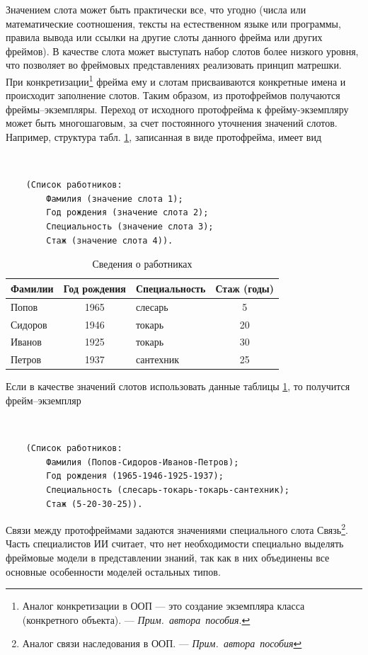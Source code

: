 \documentclass[12pt, openany, twoside]{book} %
\def\AR{{\em Прим.~автора~пособия}}
\begin{document}
Значением слота может быть практически все, что угодно (числа или математические соотношения, тексты на естественном языке или программы, правила вывода или ссылки на другие слоты данного фрейма или других фреймов). В качестве слота может выступать набор слотов более низкого уровня, что позволяет во фреймовых представлениях реализовать принцип матрешки. При конкретизации\footnote{Аналог конкретизации в ООП --- это создание экземпляра класса (конкретного объекта). --- \AR.} фрейма ему и слотам присваиваются конкретные имена и происходит заполнение слотов. Таким образом, из протофреймов получаются фреймы--экземпляры. Переход от исходного протофрейма к фрейму-эк\-зем\-пля\-ру может быть многошаговым, за счет постоянного
уточнения значений слотов. Например, структура табл. \ref{tab:frame}, записанная в виде протофрейма, имеет вид
{\tt
\begin{verbatim}
    (Список работников:
        Фамилия (значение слота 1);
        Год рождения (значение слота 2);
        Специальность (значение слота 3);
        Стаж (значение слота 4)).
\end{verbatim}}

\begin{table}[h]
\begin{center}
\begin{tabular}{|lclc|}
 \hline
 Фамилии & Год рождения  &  Специальность &  Стаж (годы)
 \\\hline\hline
 Попов &  1965 &   слесарь & 5
   \\\hline
   Сидоров & 1946  &  токарь & 20
    \\\hline
    Иванов & 1925  &  токарь & 30
    \\\hline
    Петров & 1937  &  сантехник &  25
    \\\hline
\end{tabular}
\end{center}
\caption{Сведения о работниках} \label{tab:frame}
\end{table}

Если в качестве значений слотов использовать данные таблицы \ref{tab:frame}, то получится фрейм--экземпляр
{\tt
\begin{verbatim}
    (Список работников:
        Фамилия (Попов-Сидоров-Иванов-Петров);
        Год рождения (1965-1946-1925-1937);
        Специальность (слесарь-токарь-токарь-сантехник);
        Стаж (5-20-30-25)).
\end{verbatim}}

Связи между протофреймами задаются значениями специального слота Связь\footnote{Аналог связи наследования в ООП. --- \AR}. Часть специалистов ИИ считает, что нет необходимости специально выделять фреймовые модели в представлении знаний, так как в них объединены все основные особенности моделей остальных типов.
\end{document}

